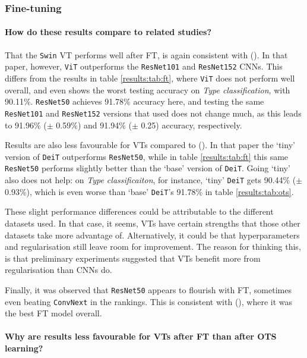 \subsubsection{Fine-tuning} \label{exp:int:ft}

\paragraph{How do these results compare to related studies?}
That the \texttt{Swin} VT performs well after FT, is again consistent with \citeauthor{zhou2021convnets} (\citeyear{zhou2021convnets}). In that paper, however, \texttt{ViT} outperforms the \texttt{ResNet101} and \texttt{ResNet152} CNNs. This differs from the results in table \ref{results:tab:ft}, where \texttt{ViT} does not perform well overall, and even shows the worst testing accuracy on \textit{Type classification}, with 90.11\%. \texttt{ResNet50} achieves 91.78\% accuracy here, and testing the same \texttt{ResNet101} and \texttt{ResNet152} versions that \citeauthor{zhou2021convnets} used does not change much, as this leads to 91.96\% ($\pm$ 0.59\%) and 91.94\% ($\pm$ 0.25) accuracy, respectively.

Results are also less favourable for VTs compared to \citeauthor{matsoukas2021time} (\citeyear{matsoukas2021time}). In that paper the `tiny' version of \texttt{DeiT} outperforms \texttt{ResNet50}, while in table \ref{results:tab:ft} this same \texttt{ResNet50} performs slightly better than the `base' version of \texttt{DeiT}. Going `tiny' also does not help: on \textit{Type classificaiton}, for instance, `tiny' \texttt{DeiT} gets 90.44\% ($\pm$ 0.93\%), which is even worse than `base' \texttt{DeiT}'s 91.78\% in table \ref{results:tab:ots}.

These slight performance differences could be attributable to the different datasets used. In that case, it seems, VTs have certain strengths that those other datasets take more advantage of. Alternatively, it could be that hyperparameters and regularisation still leave room for improvement. The reason for thinking this, is that preliminary experiments suggested that VTs benefit more from regularisation than CNNs do.

Finally, it was observed that \texttt{ResNet50} appears to flourish with FT, sometimes even beating \texttt{Conv\-Next} in the rankings. This is consistent with \citeauthor{sabatelli2018deep} (\citeyear{sabatelli2018deep}), where it was the best FT model overall.

\paragraph{Why are results less favourable for VTs after FT than after OTS learning?}

